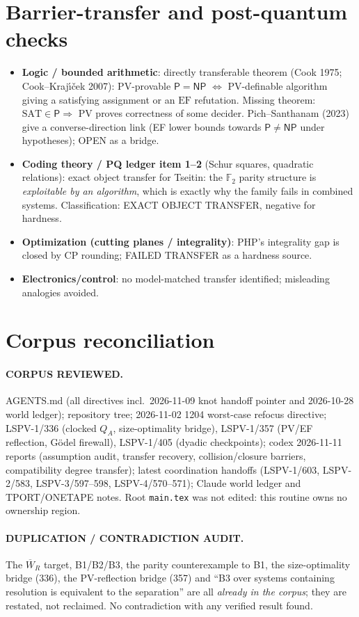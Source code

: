 \documentclass[11pt]{article}
\theoremstyle{definition}
\newcommand{\SAT}{\mathrm{SAT}}
\newcommand{\Wb}{\overline W}
\newcommand{\EF}{\mathrm{EF}}
\begin{document}
\section{Barrier-transfer and post-quantum checks}
\begin{itemize}
\item \textbf{Logic / bounded arithmetic}: directly transferable theorem
(Cook 1975; Cook--Kraj\'\i\v{c}ek 2007): PV-provable $\mathsf P=\mathsf{NP}$
$\Leftrightarrow$ PV-definable algorithm giving a satisfying assignment or an
$\EF$ refutation. Missing theorem: $\SAT\in\mathsf P\Rightarrow$ PV proves
correctness of some decider. Pich--Santhanam (2023) give a converse-direction
link (EF lower bounds towards $\mathsf P\ne\mathsf{NP}$ under hypotheses); OPEN as a bridge.
\item \textbf{Coding theory / PQ ledger item 1--2} (Schur squares, quadratic
relations): exact object transfer for Tseitin: the $\mathbb F_2$ parity structure
is \emph{exploitable by an algorithm}, which is exactly why the family fails in
combined systems. Classification: EXACT OBJECT TRANSFER, negative for hardness.
\item \textbf{Optimization (cutting planes / integrality)}: PHP's integrality gap
is closed by CP rounding; FAILED TRANSFER as a hardness source.
\item \textbf{Electronics/control}: no model-matched transfer identified;
misleading analogies avoided.
\end{itemize}

\section{Corpus reconciliation}
\paragraph{CORPUS REVIEWED.} AGENTS.md (all directives incl.\ 2026-11-09 knot
handoff pointer and 2026-10-28 world ledger); repository tree; 2026-11-02 1204
worst-case refocus directive; LSPV-1/336 (clocked $Q_A$, size-optimality
bridge), LSPV-1/357 (PV/EF reflection, G\"odel firewall), LSPV-1/405
(dyadic checkpoints); codex 2026-11-11 reports (assumption audit, transfer
recovery, collision/closure barriers, compatibility degree transfer); latest
coordination handoffs (LSPV-1/603, LSPV-2/583, LSPV-3/597--598, LSPV-4/570--571);
Claude world ledger and TPORT/ONETAPE notes. Root \texttt{main.tex} was not
edited: this routine owns no ownership region.
\paragraph{DUPLICATION / CONTRADICTION AUDIT.} The $\Wb_R$ target, B1/B2/B3,
the parity counterexample to B1, the size-optimality bridge (336), the
PV-reflection bridge (357) and ``B3 over systems containing resolution is
equivalent to the separation'' are all \emph{already in the corpus}; they are
restated, not reclaimed. No contradiction with any verified result found.
\end{document}
